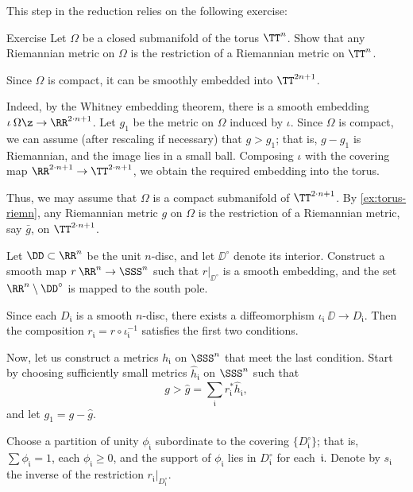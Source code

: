 This step in the reduction relies on the following exercise:

\begin{thm}{Exercise}\label{ex:torus-riemn}
Let $\Omega$ be a closed submanifold of the torus $\TT^n$.
Show that any Riemannian metric on $\Omega$ is the restriction of a Riemannian metric on $\TT^n$.
\end{thm}

Since $\Omega$ is compact, it can be smoothly embedded into $\TT^{2n+1}$.

Indeed, by the Whitney embedding theorem, there is a smooth embedding $\iota\:\Omega\z\to \RR^{2\cdot n+1}$.
Let $g_1$ be the metric on $\Omega$ induced by $\iota$.
Since $\Omega$ is compact, we can assume (after rescaling if necessary) that $g>g_1$; that is, $g-g_1$ is Riemannian, and the image lies in a small ball.
Composing $\iota$ with the covering map $\RR^{2\cdot n+1}\to \TT^{2\cdot n+1}$, we obtain the required embedding into the torus.

Thus, we may  assume that $\Omega$ is a compact submanifold of $\TT^{2\cdot n+1}$.
By \ref{ex:torus-riemn}, any Riemannian metric $g$ on $\Omega$ is the restriction of a Riemannian metric, say $\bar g$, on $\TT^{2\cdot n+1}$.













Let $\DD \subset \RR^n$ be the unit $n$-disc, and let $\DD^\circ$ denote its interior.
Construct a smooth map $r\:\RR^n \to \SSS^n$ such that $r|_{\DD^\circ}$ is a smooth embedding, and the set $\RR^n \setminus \DD^\circ$ is mapped to the south pole.

Since each $D_{\mathfrak{i}}$ is a smooth $n$-disc, there exists a diffeomorphism $\iota_{\mathfrak{i}}\:\DD \to D_{\mathfrak{i}}$.
Then the composition $r_{\mathfrak{i}} = r \circ \iota_{\mathfrak{i}}^{-1}$ satisfies the first two conditions.

Now, let us construct a metrics $h_{\mathfrak{i}}$ on $\SSS^n$ that meet the last condition.
Start by choosing sufficiently small metrics $\hat h_{\mathfrak{i}}$ on $\SSS^n$ such that
\[
g > \hat g = \sum_{\mathfrak{i}} r_{\mathfrak{i}}^* \hat h_{\mathfrak{i}},
\]
and let $g_1 = g - \hat g$.

Choose a partition of unity $\phi_{\mathfrak{i}}$ subordinate to the covering $\{D_{\mathfrak{i}}^\circ\}$;
that is, $\sum \phi_{\mathfrak{i}} = 1$, each $\phi_{\mathfrak{i}} \ge 0$, and the support of $\phi_{\mathfrak{i}}$ lies in $D_{\mathfrak{i}}^\circ$ for each~$\mathfrak{i}$.
Denote by $s_{\mathfrak{i}}$ the inverse of the restriction $r_{\mathfrak{i}}|_{D_{\mathfrak{i}}^\circ}$.

